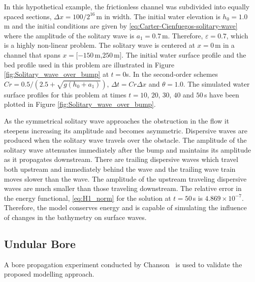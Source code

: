 \documentclass[preprint,sort&compress,1p]{article}
\begin{document}
In this hypothetical example, the frictionless channel was subdivided into equally spaced sections, $\Delta x = 100/2^{16}$\,m in width. The initial water elevation is $h_0 = 1.0$\,m and the initial conditions are given by \eqref{eq:Carter-Cienfuegos-solitary-wave} where the amplitude of the solitary wave is $a_1 = 0.7$\,m. Therefore, $\varepsilon = 0.7$, which is a highly non-linear problem. The solitary wave is centered at $x = 0$\,m in a channel that spans $x = [-150$\,m,$250$\,m$]$.  The initial water surface profile and the bed profile used in this problem are illustrated in Figure \ref{fig:Solitary_wave_over_bump} at $t = 0$s. In the second-order schemes $Cr = 0.5/(2.5+\sqrt{g(h_0 + a_1)})$, $\Delta t = Cr\Delta x$ and $\theta = 1.0$. The simulated water surface profiles for this problem at times $t = 10$, $20$, $30$, $40$ and $50$\,s have been plotted in Figure \ref{fig:Solitary_wave_over_bump}.

As the symmetrical solitary wave approaches the obstruction in the flow it steepens increasing its amplitude and becomes asymmetric.  Dispersive waves are produced when the solitary wave travels over the obstacle. The amplitude of the solitary wave attenuates immediately after the bump and maintains its amplitude as it propagates downstream. There are trailing dispersive waves which travel both upstream and immediately behind the wave and the trailing wave train moves slower than the wave. The amplitude of the upstream traveling dispersive waves are much smaller than those traveling downstream.  The relative error in the energy functional, \eqref{eq:H1_norm} for the solution at $t = 50$\,s is $4.869 \times 10^{-7}$. Therefore, the model conserves energy and is capable of simulating the influence of changes in the bathymetry on surface waves.


\subsection{Undular Bore}\label{Undular Bore}

A bore propagation experiment conducted by Chanson~\cite{Chanson-H-2009-104} is used to validate the proposed modelling approach.
\end{document}
